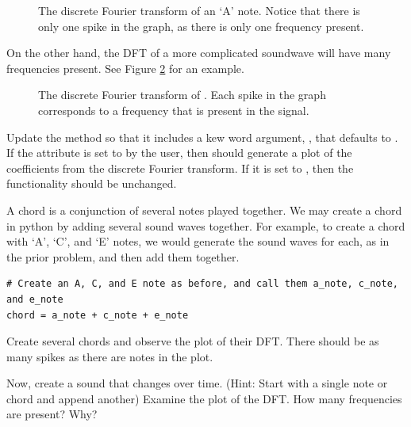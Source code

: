 \begin{center}
\begin{figure}
\caption{The discrete Fourier transform of an `A' note.  Notice that there is only one spike in the graph, as there is only one frequency present.}
\label{fig:dft_a}
\end{figure}
\end{center}

On the other hand, the DFT of a more complicated soundwave will have many frequencies present.
See Figure \ref{fig:dft_tada} for an example.

\begin{center}
\begin{figure}
\caption{The discrete Fourier transform of .  Each spike in the graph corresponds to a frequency that is present in the signal.}
\label{fig:dft_tada}
\end{figure}
\end{center} 

\begin{problem}

Update the  method so that it includes a kew word argument, , that defaults to .
If the  attribute is set to  by the user, then  should generate a plot of the coefficients from the discrete Fourier transform.
If it is set to , then the functionality should be unchanged.

\end{problem}

\begin{problem}

A chord is a conjunction of several notes played together.
We may create a chord in python by adding several sound waves together.
For example, to create a chord with `A', `C', and `E' notes, we would generate the sound waves for each, as in the prior problem, and then add them together.
\begin{lstlisting}
# Create an A, C, and E note as before, and call them a_note, c_note, and e_note
chord = a_note + c_note + e_note
\end{lstlisting}

Create several chords and observe the plot of their DFT.
There should be as many spikes as there are notes in the plot.

Now, create a sound that changes over time.
(Hint: Start with a single note or chord and append another)
Examine the plot of the DFT.
How many frequencies are present?  Why?

\end{problem}

